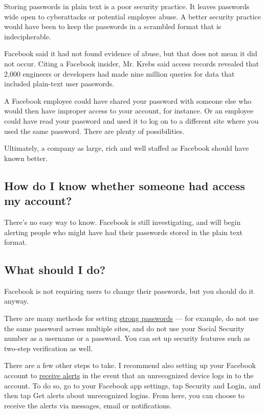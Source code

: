 Storing passwords in plain text is a poor security practice. It leaves
passwords wide open to cyberattacks or potential employee abuse. A
better security practice would have been to keep the passwords in a
scrambled format that is indecipherable.

Facebook said it had not found evidence of abuse, but that does not mean
it did not occur. Citing a Facebook insider, Mr. Krebs said access
records revealed that 2,000 engineers or developers had made nine
million queries for data that included plain-text user passwords.

A Facebook employee could have shared your password with someone else
who would then have improper access to your account, for instance. Or an
employee could have read your password and used it to log on to a
different site where you used the same password. There are plenty of
possibilities.

Ultimately, a company as large, rich and well staffed as Facebook should
have known better.

\hypertarget{how-do-i-know-whether-someone-had-access-my-account}{%
\subsection{How do I know whether someone had access my
account?}\label{how-do-i-know-whether-someone-had-access-my-account}}

There's no easy way to know. Facebook is still investigating, and will
begin alerting people who might have had their passwords stored in the
plain text format.

\hypertarget{what-should-i-do}{%
\subsection{What should I do?}\label{what-should-i-do}}

Facebook is not requiring users to change their passwords, but you
should do it anyway.

There are many methods for setting
\href{https://www.nytimes.com/interactive/2017/technology/how-to-protect-data-online.html}{strong
passwords} --- for example, do not use the same password across multiple
sites, and do not use your Social Security number as a username or a
password. You can set up security features such as two-step verification
as well.

There are a few other steps to take. I recommend also setting up your
Facebook account to
\href{https://www.facebook.com/about/basics/stay-safe-and-secure/login-alerts\#1}{receive
alerts} in the event that an unrecognized device logs in to the account.
To do so, go to your Facebook app settings, tap Security and Login, and
then tap Get alerts about unrecognized logins. From here, you can choose
to receive the alerts via messages, email or notifications.

